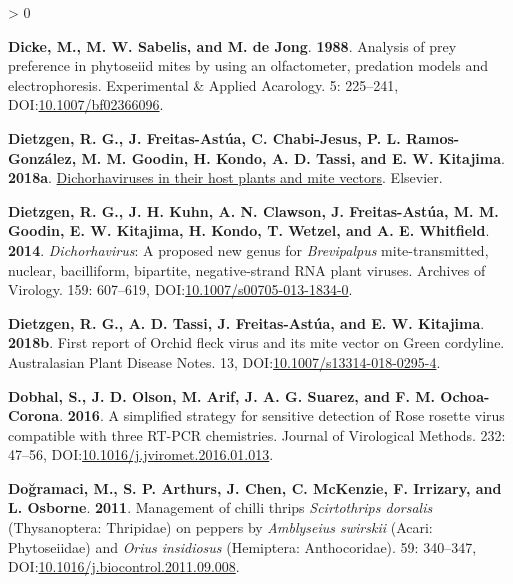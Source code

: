 \documentclass{ufdissertation}[overrideChapters] %
\newlength{\cslhangindent}
\newenvironment{CSLReferences}[2] %
 {%
  \setlength{\parindent}{0pt}
  \ifodd #1 \everypar{\setlength{\hangindent}{\cslhangindent}}\ignorespaces\fi
  \ifnum #2 > 0
  \setlength{\parskip}{#2\baselineskip}
  \fi
 }%
 {}
\begin{document}
{\begin{CSLReferences}{1}{1}
\leavevmode{}%
\textbf{Dicke, M., M. W. Sabelis, and M. de Jong}. \textbf{1988}. Analysis of prey preference in phytoseiid mites by using an olfactometer, predation models and electrophoresis. Experimental {\&} Applied Acarology. 5: 225--241, DOI:\href{https://doi.org/10.1007/bf02366096}{10.1007/bf02366096}.

\leavevmode{}%
\textbf{Dietzgen, R. G., J. Freitas-Astúa, C. Chabi-Jesus, P. L. Ramos-González, M. M. Goodin, H. Kondo, A. D. Tassi, and E. W. Kitajima}. \textbf{2018a}. \href{https://doi.org/10.1016/bs.aivir.2018.06.001}{Dichorhaviruses in their host plants and mite vectors}. Elsevier.

\leavevmode{}%
\textbf{Dietzgen, R. G., J. H. Kuhn, A. N. Clawson, J. Freitas-Astúa, M. M. Goodin, E. W. Kitajima, H. Kondo, T. Wetzel, and A. E. Whitfield}. \textbf{2014}. {\emph{Dichorhavirus}}: A proposed new genus for {\emph{Brevipalpus}} mite-transmitted, nuclear, bacilliform, bipartite, negative-strand {RNA} plant viruses. Archives of Virology. 159: 607--619, DOI:\href{https://doi.org/10.1007/s00705-013-1834-0}{10.1007/s00705-013-1834-0}.

\leavevmode{}%
\textbf{Dietzgen, R. G., A. D. Tassi, J. Freitas-Astúa, and E. W. Kitajima}. \textbf{2018b}. First report of {Orchid fleck virus} and its mite vector on {Green cordyline}. Australasian Plant Disease Notes. 13, DOI:\href{https://doi.org/10.1007/s13314-018-0295-4}{10.1007/s13314-018-0295-4}.

\leavevmode{}%
\textbf{Dobhal, S., J. D. Olson, M. Arif, J. A. G. Suarez, and F. M. Ochoa-Corona}. \textbf{2016}. A simplified strategy for sensitive detection of {Rose rosette virus} compatible with three {RT}-{PCR} chemistries. Journal of Virological Methods. 232: 47--56, DOI:\href{https://doi.org/10.1016/j.jviromet.2016.01.013}{10.1016/j.jviromet.2016.01.013}.

\leavevmode{}%
\textbf{Doğramaci, M., S. P. Arthurs, J. Chen, C. McKenzie, F. Irrizary, and L. Osborne}. \textbf{2011}. Management of chilli thrips {\emph{Scirtothrips dorsalis}} ({Thysanoptera}: {Thripidae}) on peppers by {\emph{Amblyseius swirskii}} ({Acari}: {Phytoseiidae}) and {\emph{Orius insidiosus}} ({Hemiptera}: {Anthocoridae}). 59: 340--347, DOI:\href{https://doi.org/10.1016/j.biocontrol.2011.09.008}{10.1016/j.biocontrol.2011.09.008}.


\end{CSLReferences}}
\end{document}
